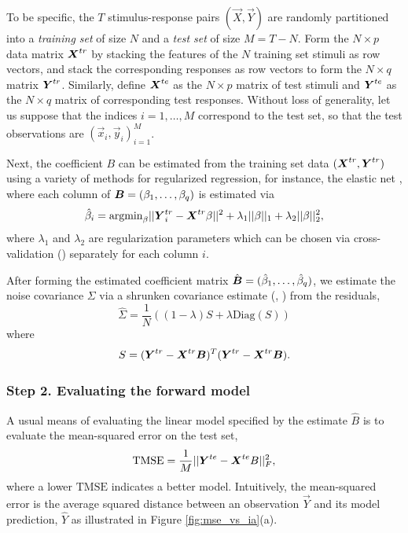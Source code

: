 To be specific, the $T$ stimulus-response pairs $(\vec{X}, \vec{Y})$
are randomly partitioned into a \emph{training set} of size $N$ and a
\emph{test set} of size $M = T-N$.  Form the $N \times p$ data matrix
$\boldsymbol{X}^{tr}$ by stacking the features of the $N$ training set stimuli as
row vectors, and stack the corresponding responses as row vectors to
form the $N \times q$ matrix $\boldsymbol{Y}^{tr}$.  Similarly, define $\boldsymbol{X}^{te}$
as the $N \times p$ matrix of test stimuli and $\boldsymbol{Y}^{te}$ as the $N
\times q$ matrix of corresponding test responses.  Without loss of
generality, let us suppose that the indices $i = 1,\hdots, M$
correspond to the test set, so that the test observations are
$(\vec{x}_i, \vec{y}_i)_{i=1}^M$.

Next, the coefficient $B$ can be estimated from the training set data
$(\boldsymbol{X}^{tr}, \boldsymbol{Y}^{tr})$ using a variety of methods for regularized
regression, for instance, the elastic net \cite{Zou2005}, where each
column of $\boldsymbol{B} = (\beta_1,\hdots, \beta_q)$ is estimated via
\[
\hat{\beta}_i = \text{argmin}_\beta ||\boldsymbol{Y}_i^{tr} - \boldsymbol{X}^{tr} \beta||^2 + \lambda_1 ||\beta||_1 + \lambda_2 ||\beta||_2^2,
\]
where $\lambda_1$ and $\lambda_2$ are regularization parameters which
can be chosen via cross-validation (\cite{Hastie2009a}) separately for
each column $i$.

After forming the estimated coefficient matrix $\hat{\boldsymbol{B}} =
(\hat{\beta}_1,\hdots, \hat{\beta}_q)$, we estimate the noise
covariance $\Sigma$ via a shrunken covariance
estimate (\cite{Ledoit2004}, \cite{Daniels2001}) from the residuals,
\[
\hat{\Sigma} = \frac{1}{N} ((1-\lambda) S + \lambda \text{Diag}(S)) 
\]
where
\[
S = (\boldsymbol{Y}^{tr} - \boldsymbol{X}^{tr} \boldsymbol{B})^T (\boldsymbol{Y}^{tr} - \boldsymbol{X}^{tr} \boldsymbol{B}).
\]

\subsubsection{Step 2. Evaluating the forward model}

A usual means of evaluating the linear model specified by the estimate
$\hat{B}$ is to evaluate the mean-squared error on the test set,
\[
\text{TMSE} = \frac{1}{M}||\boldsymbol{Y}^{te} - \boldsymbol{X}^{te} B||^2_F,
\]
where a lower $\text{TMSE}$ indicates a better model.  Intuitively,
the mean-squared error is the average squared distance between an
observation $\vec{Y}$ and its model prediction, $\hat{Y}$
as illustrated in Figure \ref{fig:mse_vs_ia}(a).

